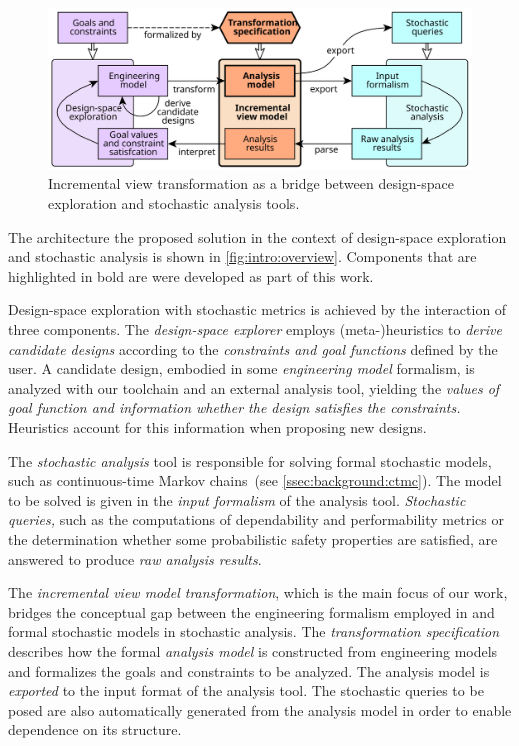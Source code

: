 \begin{figure}
  \centering
  \includegraphics[scale=0.9]{figures/overview}
  \caption{Incremental view transformation as a bridge between design-space exploration and stochastic analysis tools.}
  \label{fig:intro:overview}
\end{figure}

The architecture the proposed solution in the context of design-space exploration and stochastic analysis is shown in \vref{fig:intro:overview}. Components that are highlighted in bold are were developed as part of this work.

Design-space exploration with stochastic metrics is achieved by the interaction of three components. The \emph{design-space explorer} employs (meta-)heuristics to \emph{derive candidate designs} according to the \emph{constraints and goal functions} defined by the user. A candidate design, embodied in some \emph{engineering model} formalism, is analyzed with our toolchain and an external analysis tool, yielding the \emph{values of goal function and information whether the design satisfies the constraints.} Heuristics account for this information when proposing new designs.

The \emph{stochastic analysis} tool is responsible for solving formal stochastic models, such as continuous-time Markov chains~(see \vref{ssec:background:ctmc}). The model to be solved is given in the \emph{input formalism} of the analysis tool. \emph{Stochastic queries,} such as the computations of dependability and performability metrics or the determination whether some probabilistic safety properties are satisfied, are answered to produce \emph{raw analysis results}. 

The \emph{incremental view model transformation}, which is the main focus of our work, bridges the conceptual gap between the engineering formalism employed in  and formal stochastic models in stochastic analysis. The \emph{transformation specification} describes how the formal \emph{analysis model} is constructed from engineering models and formalizes the goals and constraints to be analyzed. The analysis model is \emph{exported} to the input format of the analysis tool. The stochastic queries to be posed are also automatically generated from the analysis model in order to enable dependence on its structure.


